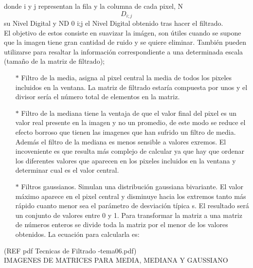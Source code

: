 donde i y j representan la fila y la columna de cada pixel, N \[D_{i;j}\] su Nivel Digital y ND 0 i;j el Nivel Digital obtenido tras hacer el filtrado.\\

El objetivo de estos consiste en suavizar la im\'agen, son útiles cuando se supone que la imagen tiene gran cantidad de ruido y se quiere eliminar. También pueden utilizarse para resaltar la información correspondiente a una determinada escala (tamaño de la matriz de filtrado); 


\begin{itemize}
	\item[$*$] Filtro de la media, asigna al pixel central la media de todos los pixeles incluidos en la ventana. La matriz de filtrado estaría compuesta por unos y el divisor sería el número total de elementos en la matriz.					\item[$*$] Filtro de la mediana tiene la ventaja de que el valor final del pixel es un valor real presente en la imagen y no un promedio, de este modo se reduce el efecto borroso que tienen las imagenes que han sufrido un filtro de media. Además el filtro de la mediana es menos sensible a valores exremos. El incoveniente es que resulta más complejo de calcular ya que hay que ordenar los diferentes valores que aparecen en los pixeles incluidos en la ventana y determinar cual es el valor central.
	\item[$*$]Filtros gaussianos. Simulan una distribución gaussiana bivariante. El valor máximo aparece en el pixel central y disminuye hacia los extremos tanto más rápido cuanto menor sea el parámetro de desviación típica s. El resultado será un conjunto de valores entre 0 y 1. Para transformar la matriz a una matriz de números enteros se divide toda la matriz por el menor de los valores obtenidos. La ecuación para calcularla es:
\end{itemize}

(REF pdf Tecnicas de Filtrado -tema06.pdf)\\

IMAGENES DE MATRICES PARA MEDIA, MEDIANA Y GAUSSIANO\\


